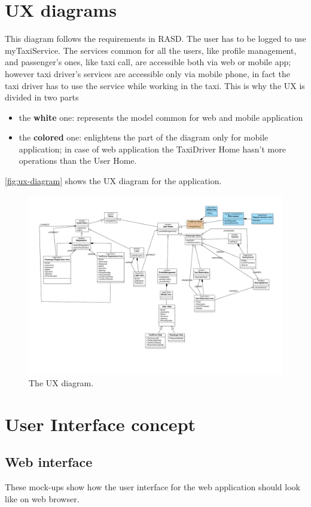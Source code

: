 \section{UX diagrams}
This diagram follows the requirements in RASD. 
The user has to be logged to use myTaxiService. 
The services common for all the users, like profile management, and passenger's ones, like taxi call, are accessible both via web or mobile app; however taxi driver's services are accessible only via mobile phone, in fact the taxi driver has to use the service while working in the taxi.
This is why the UX is divided in two parts 
\begin{itemize}
\item the {\bf white} one: represents the model common for web and mobile application
\item the {\bf colored} one: enlightens the part of the diagram only for mobile application; in case of web application the TaxiDriver Home hasn't more operations than the User Home.
\end{itemize}
\autoref{fig:ux-diagram} shows the UX diagram for the application.

\begin{figure}[h]
\centering
\includegraphics[width=\textwidth]{diagrams/UXdiagramSE2}
\caption{The UX diagram.}
\label{fig:ux-diagram}
\end{figure}

\FloatBarrier
\section{User Interface concept}

\subsection{Web interface}
These mock-ups show how the user interface for the web application should look like on web browser.

